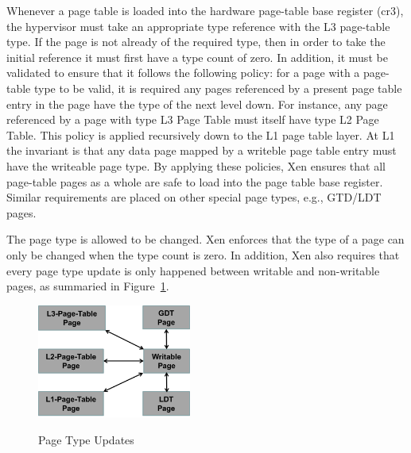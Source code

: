 Whenever a page table is loaded into the hardware page-table base register (cr3), 
the hypervisor must take an appropriate type reference with the L3 page-table type.
If the page is not already of the required type, then in order to take the initial reference it must first have a type count of zero.
In addition, it must be validated to ensure that it follows the following policy: 
for a page with a page-table type to be valid, it is required any pages referenced 
by a present page table entry in the page have the type of the next level down. 
For instance, any page referenced by a page with type L3 Page Table must itself have type L2 Page Table. 
This policy is applied recursively down to the L1 page table layer. 
At L1 the invariant is that any data page mapped by a writeble page table entry must have the writeable page type.
By applying these policies, Xen ensures that all page-table pages as a whole are safe to load into the page table base register.
Similar requirements are placed on other special page types, e.g., GTD/LDT pages.

The page type is allowed to be changed. 
Xen enforces that the type of a page can only be changed when the type count is zero.  
In addition, Xen also requires that every page type update is only happened between writable and non-writable pages, as summaried in Figure~\ref{fig:page-type-updates}.


\begin{figure}[ht]
\centering
\includegraphics[width=0.45\textwidth]{image/background/page-type-updates.png} \\
\caption{Page Type Updates}
\label{fig:page-type-updates}
\end{figure}


